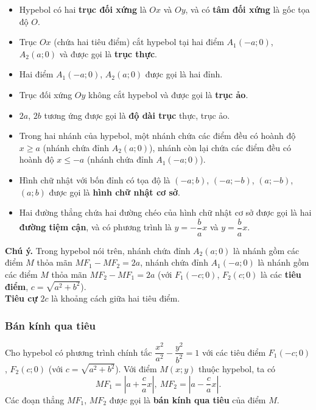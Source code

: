 \begin{itemize}
    \item Hypebol có hai \textbf{trục đối xứng} là $ Ox $ và $ Oy $, và có \textbf{tâm đối xứng} là gốc tọa độ $ O $.
    \item Trục $ Ox $ (chứa hai tiêu điểm) cắt hypebol tại hai điểm $ A_1(-a; 0) $, $ A_2(a; 0) $ và được gọi là \textbf{trục thực}.
    \item Hai điểm $ A_1(-a; 0) $, $ A_2(a; 0) $ được gọi là hai đỉnh.
    \item Trục đối xứng $ Oy $ không cắt hypebol và được gọi là \textbf{trục ảo}.
    \item $ 2a $, $ 2b $ tương ứng được gọi là \textbf{độ dài trục} thực,  trục ảo.
    \item Trong hai nhánh của hypebol, một nhánh chứa các điểm đều  có hoành độ $ x\ge a $ (nhánh chứa đỉnh $ A_2(a; 0) $), nhánh còn lại chứa các điểm đều có hoành độ $ x\le -a $ (nhánh chứa đỉnh $ A_1(-a; 0) $).
    \item Hình chữ nhật với bốn đỉnh có tọa độ là $ (-a; b) $, $ (-a; -b) $, $ (a; -b) $, $ (a; b) $ được gọi là \textbf{hình chữ nhật cơ sở}.
    \item Hai đường thẳng chứa hai đường chéo của hình chữ nhật cơ sở được gọi là hai \textbf{đường tiệm cận}, và có phương trình là $ y=-\dfrac{b}{a}x $ và $ y=\dfrac{b}{a}x $.
\end{itemize}
\begin{luuy}
    \textbf{Chú ý.}
    Trong hypebol nói trên, nhánh chứa đỉnh $ A_2(a; 0) $ là nhánh gồm các điểm $ M $ thỏa mãn $ MF_1-MF_2=2a $, nhánh chứa đỉnh $ A_1(-a; 0) $ là nhánh gồm các điểm $ M $ thỏa mãn $ MF_2-MF_1=2a $ (với $ F_1(-c; 0) $, $ F_2(c; 0) $ là các \textbf{tiêu điểm}, $ c=\sqrt{a^2+b^2} $).\\
    \textbf{Tiêu cự} $ 2c $ là khoảng cách giữa hai tiêu điểm.
\end{luuy} 
\subsubsection{Bán kính qua tiêu}
Cho hypebol có phương trình chính tắc $ \dfrac{x^2}{a^2}-\dfrac{y^2}{b^2}=1 $ với các tiêu điểm $ F_1(-c; 0) $, $ F_2(c; 0) $ (với $ c=\sqrt{a^2+b^2} $). Với điểm $ M(x; y) $ thuộc hypebol, ta có 
$$ MF_1=\left|a+\dfrac{c}{a}x\right|,\ MF_2=\left|a-\dfrac{c}{a}x\right|. $$
Các đoạn thẳng $ MF_1 $, $ MF_2 $ được gọi là \textbf{bán kính qua tiêu} của điểm $ M $.
